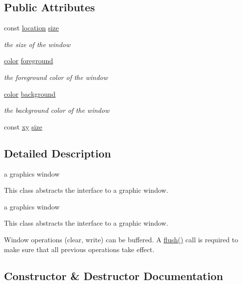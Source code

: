 \subsection*{Public Attributes}
\begin{DoxyCompactItemize}
\item 
const \hyperlink{classhwlib_1_1location}{location} \hyperlink{classhwlib_1_1window_ad2ad5281c9c09d18010b19cb807d3eaa}{size}
\begin{DoxyCompactList}\small\item\em the size of the window \end{DoxyCompactList}\item 
\hyperlink{classhwlib_1_1color}{color} \hyperlink{classhwlib_1_1window_a812e3bf440309bf3280d34fa04eeb718}{foreground}
\begin{DoxyCompactList}\small\item\em the foreground color of the window \end{DoxyCompactList}\item 
\hyperlink{classhwlib_1_1color}{color} \hyperlink{classhwlib_1_1window_a1ca47e79ec54ea8b2f38b41b42593d2d}{background}
\begin{DoxyCompactList}\small\item\em the background color of the window \end{DoxyCompactList}\item 
const \hyperlink{classhwlib_1_1xy}{xy} \hyperlink{classhwlib_1_1window_a4bcb3ccedcd692af6760c3dcb332c659}{size}
\end{DoxyCompactItemize}


\subsection{Detailed Description}
a graphics window 

This class abstracts the interface to a graphic window.

a graphics window

This class abstracts the interface to a graphic window.

Window operations (clear, write) can be buffered. A \hyperlink{classhwlib_1_1window_a2b654a98872d174173e1df24a444c949}{flush()} call is required to make sure that all previous operations take effect. 

\subsection{Constructor \& Destructor Documentation}
\mbox{\label{classhwlib_1_1window_a41696e8593067bcd0f55525a56d7adb7}} 
